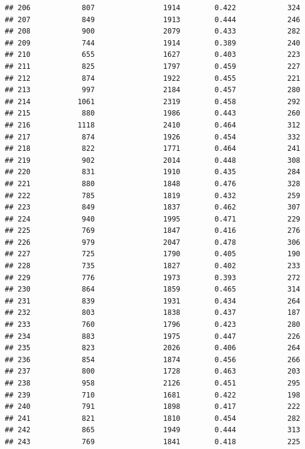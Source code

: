\documentclass[]{book}
\begin{document}
\begin{verbatim}
## 206            807                1914        0.422            324
## 207            849                1913        0.444            246
## 208            900                2079        0.433            282
## 209            744                1914        0.389            240
## 210            655                1627        0.403            223
## 211            825                1797        0.459            227
## 212            874                1922        0.455            221
## 213            997                2184        0.457            280
## 214           1061                2319        0.458            292
## 215            880                1986        0.443            260
## 216           1118                2410        0.464            312
## 217            874                1926        0.454            332
## 218            822                1771        0.464            241
## 219            902                2014        0.448            308
## 220            831                1910        0.435            284
## 221            880                1848        0.476            328
## 222            785                1819        0.432            259
## 223            849                1837        0.462            307
## 224            940                1995        0.471            229
## 225            769                1847        0.416            276
## 226            979                2047        0.478            306
## 227            725                1790        0.405            190
## 228            735                1827        0.402            233
## 229            776                1973        0.393            272
## 230            864                1859        0.465            314
## 231            839                1931        0.434            264
## 232            803                1838        0.437            187
## 233            760                1796        0.423            280
## 234            883                1975        0.447            226
## 235            823                2026        0.406            264
## 236            854                1874        0.456            266
## 237            800                1728        0.463            203
## 238            958                2126        0.451            295
## 239            710                1681        0.422            198
## 240            791                1898        0.417            222
## 241            821                1810        0.454            282
## 242            865                1949        0.444            313
## 243            769                1841        0.418            225

\end{verbatim}
\end{document}
